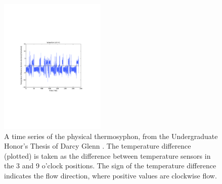 \begin{figure}[h!]
  \centering
  \includegraphics[width=0.45\textwidth]{figures/221TimeSeries.pdf}
  \caption[A time series of the physical thermosyphon, from the Undergraduate Honor's Thesis of Darcy Glenn {\protect \cite{glenn2013}}]{
    A time series of the physical thermosyphon, from the Undergraduate Honor's Thesis of Darcy Glenn {\protect \cite{glenn2013}}.
    The temperature difference (plotted) is taken as the difference between temperature sensors in the 3 and 9 o'clock positions.
    The sign of the temperature difference indicates the flow direction, where positive values are clockwise flow.
  }
  \label{fig:chrisLoop}
\end{figure}


